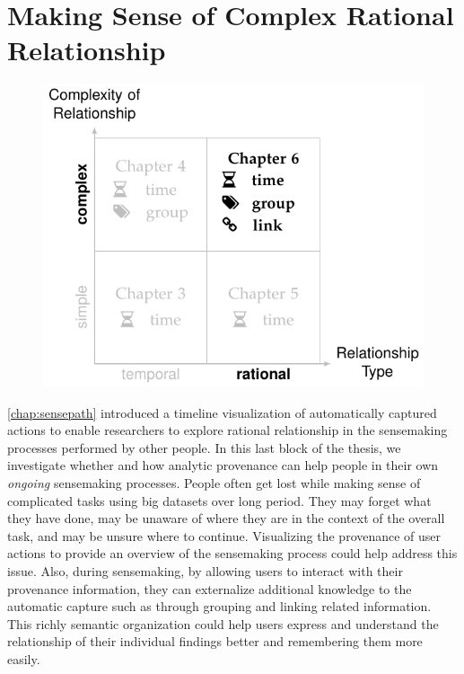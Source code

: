 \chapter{Making Sense of Complex Rational Relationship}
\label{chap:sensemap}

\graphicspath{{Chapter6/figures/}}

\begin{figure}[!htb]
	\centering
	\includegraphics{work}
\end{figure}

\vspace{1in}


\pagebreak

\autoref{chap:sensepath} introduced a timeline visualization of automatically captured actions to enable researchers to explore rational relationship in the sensemaking processes performed by other people. In this last block of the thesis, we investigate whether and how analytic provenance can help people in their own \emph{ongoing} sensemaking processes. People often get lost while making sense of complicated tasks using big datasets over long period. They may forget what they have done, may be unaware of where they are in the context of the overall task, and may be unsure where to continue. Visualizing the provenance of user actions to provide an overview of the sensemaking process could help address this issue. Also, during sensemaking, by allowing users to interact with their provenance information, they can externalize additional knowledge to the automatic capture such as through grouping and linking related information. This richly semantic organization could help users express and understand the relationship of their individual findings better and remembering them more easily.


